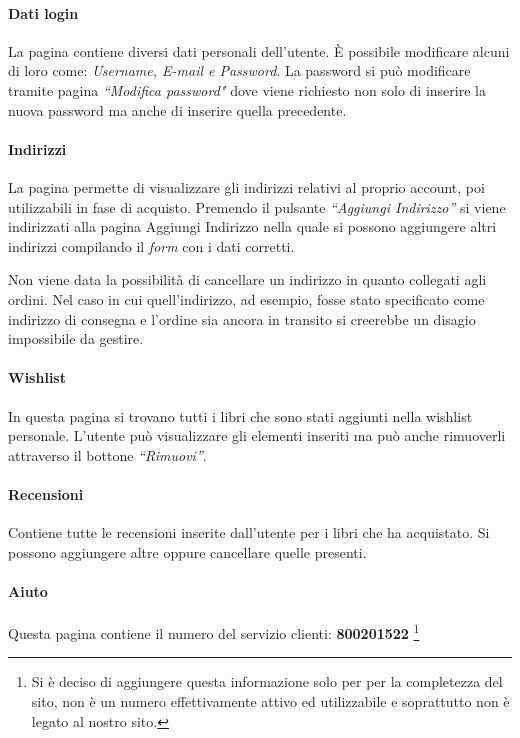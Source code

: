 \paragraph{Dati login}
La pagina contiene diversi dati personali dell'utente. È possibile modificare alcuni di loro come: \textit{Username, E-mail e Password}. La password si può modificare tramite pagina \textit{“Modifica password"} dove viene richiesto non solo di inserire la nuova password ma anche di inserire quella precedente.

\paragraph{Indirizzi}
La pagina permette di visualizzare gli indirizzi relativi al proprio account, poi utilizzabili in fase di acquisto. Premendo il pulsante \textit{“Aggiungi Indirizzo”} si viene indirizzati alla pagina Aggiungi Indirizzo nella quale si possono aggiungere altri indirizzi compilando il \textit{form} con i dati corretti.

Non viene data la possibilità di cancellare un indirizzo in quanto collegati agli ordini. Nel caso in cui quell'indirizzo, ad esempio, fosse stato specificato come indirizzo di consegna e l’ordine sia ancora in transito si creerebbe un disagio impossibile da gestire.

\paragraph{Wishlist}
In questa pagina si trovano tutti i libri che sono stati aggiunti nella wishlist personale. L’utente può visualizzare gli elementi inseriti ma può anche rimuoverli attraverso il bottone \textit{“Rimuovi”}.

\paragraph{Recensioni}
Contiene tutte le recensioni inserite dall’utente per i libri che ha acquistato. Si possono aggiungere altre oppure cancellare quelle presenti.

\paragraph{Aiuto}
Questa pagina contiene il numero del servizio clienti: \textbf{800201522} \footnote{Si è deciso di aggiungere questa informazione solo per per la completezza del sito, non è un numero effettivamente attivo ed utilizzabile e soprattutto non è legato al nostro sito.}

